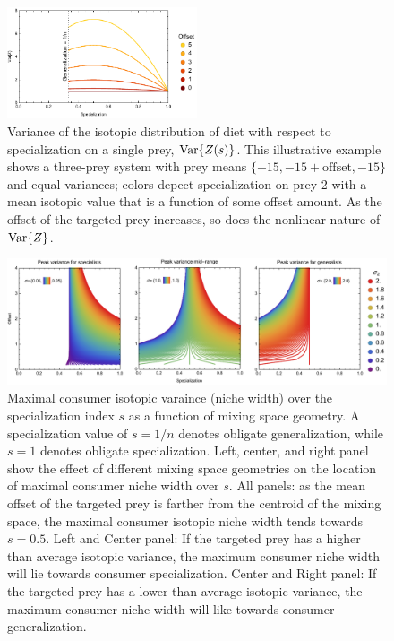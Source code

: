\documentclass{frontiersSCNS}
\begin{document}


\begin{figure}[h!]
\centering
\includegraphics[width=0.5\textwidth]{fig_var.pdf}
\caption{
Variance of the isotopic distribution of diet with respect to specialization on a single prey, ${\rm Var}\{Z(s)\}$.
This illustrative example shows a three-prey system with prey means $\{-15,-15+\mbox{offset},-15\}$ and equal variances; colors depect specialization on prey 2 with a mean isotopic value that is a function of some offset amount.
As the offset of the targeted prey increases, so does the nonlinear nature of ${\rm Var}\{Z\}$.
}
  \label{figvar}
\end{figure}

\begin{figure}[h!]
\centering
\includegraphics[width=1\textwidth]{fig_specvar.pdf}
\caption{
Maximal consumer isotopic varaince (niche width) over the specialization index $s$ as a function of mixing space geometry. A specialization value of $s=1/n$ denotes obligate generalization, while $s=1$ denotes obligate specialization.
Left, center, and right panel show the effect of different mixing space geometries on the location of maximal consumer niche width over $s$.
All panels: as the mean offset of the targeted prey is farther from the centroid of the mixing space, the maximal consumer isotopic niche width tends towards $s=0.5$.
Left and Center panel: If the targeted prey has a higher than average isotopic variance, the maximum consumer niche width will lie towards consumer specialization.
Center and Right panel: If the targeted prey has a lower than average isotopic variance, the maximum consumer niche width will like towards consumer generalization.
}
  \label{figspecvar}
\end{figure}
\end{document}
